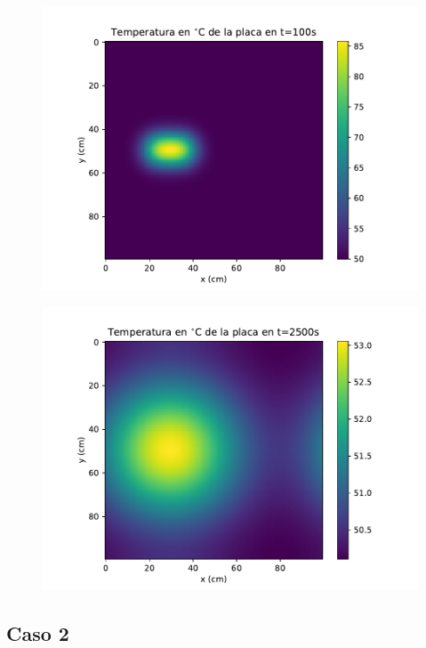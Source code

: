 \documentclass[12pt,letterpaper]{article}
\begin{document}
\begin{figure}[H]
\includegraphics{p1_100.pdf}
\centering
\end{figure}

\begin{figure}[H]
\includegraphics{p1_2500.pdf}
\centering
\end{figure}

\subsection*{Caso 2}
\end{document}
